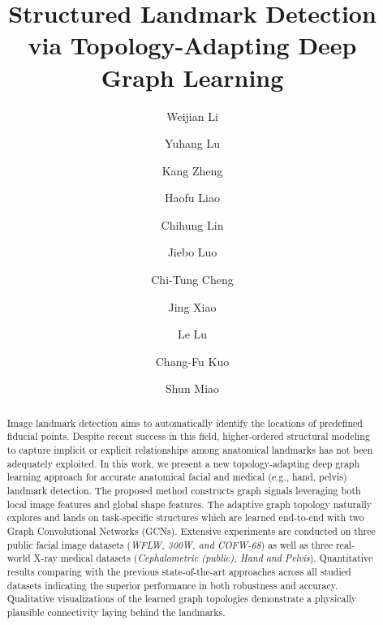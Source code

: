 \documentclass[runningheads]{llncs}
\begin{document}
\pagestyle{headings}
\mainmatter
\def\ECCVSubNumber{781}  

\title{Structured Landmark Detection via Topology-Adapting Deep Graph Learning} 



\author{Weijian Li \and
Yuhang Lu \and
Kang Zheng \and
Haofu Liao \and
Chihung Lin \and
Jiebo Luo \and
Chi-Tung Cheng \and
Jing Xiao \and
Le Lu \and
Chang-Fu Kuo \and
Shun Miao}

\maketitle
\begin{abstract}

Image landmark detection aims to automatically identify the locations of predefined fiducial points. Despite recent success in this field, higher-ordered structural modeling to capture implicit or explicit relationships among anatomical landmarks has not been adequately exploited. In this work, we present a new topology-adapting deep graph learning approach for accurate anatomical facial and medical (e.g., hand, pelvis) landmark detection. The proposed method constructs graph signals leveraging both local image features and global shape features. The adaptive graph topology naturally explores and lands on task-specific structures which are learned end-to-end with two Graph Convolutional Networks (GCNs). Extensive experiments are conducted on three public facial image datasets (\textit{WFLW, 300W, and COFW-68}) as well as three real-world X-ray medical datasets (\textit{Cephalometric (public), Hand and Pelvis}). Quantitative results comparing with the previous state-of-the-art approaches across all studied datasets indicating the superior performance in both robustness and accuracy. Qualitative visualizations of the learned graph topologies demonstrate a physically plausible connectivity laying behind the landmarks.

\end{abstract}
\end{document}
